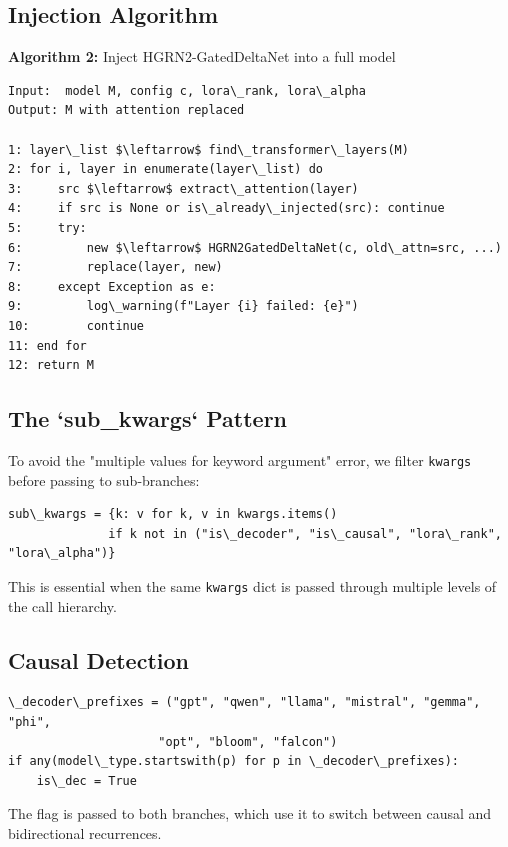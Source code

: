 \subsection{Injection Algorithm}

\textbf{Algorithm 2:} Inject HGRN2-GatedDeltaNet into a full model
\begin{lstlisting}
Input:  model M, config c, lora\_rank, lora\_alpha
Output: M with attention replaced

1: layer\_list $\leftarrow$ find\_transformer\_layers(M)
2: for i, layer in enumerate(layer\_list) do
3:     src $\leftarrow$ extract\_attention(layer)
4:     if src is None or is\_already\_injected(src): continue
5:     try:
6:         new $\leftarrow$ HGRN2GatedDeltaNet(c, old\_attn=src, ...)
7:         replace(layer, new)
8:     except Exception as e:
9:         log\_warning(f"Layer {i} failed: {e}")
10:        continue
11: end for
12: return M
\end{lstlisting}

\subsection{The `sub\_kwargs` Pattern}

To avoid the "multiple values for keyword argument" error, we filter 
\texttt{kwargs} before passing to sub-branches:

\begin{lstlisting}
sub\_kwargs = {k: v for k, v in kwargs.items() 
              if k not in ("is\_decoder", "is\_causal", "lora\_rank", "lora\_alpha")}
\end{lstlisting}

This is essential when the same \texttt{kwargs} dict is passed through multiple 
levels of the call hierarchy.

\subsection{Causal Detection}

\begin{lstlisting}
\_decoder\_prefixes = ("gpt", "qwen", "llama", "mistral", "gemma", "phi", 
                     "opt", "bloom", "falcon")
if any(model\_type.startswith(p) for p in \_decoder\_prefixes):
    is\_dec = True
\end{lstlisting}

The flag is passed to both branches, which use it to switch between 
causal and bidirectional recurrences.

